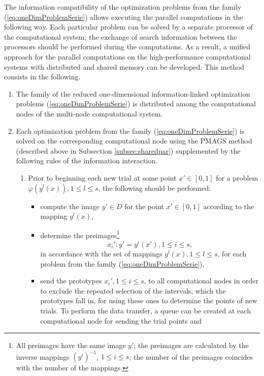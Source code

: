 \documentclass{aims}
\theoremstyle{definition}
\begin{document}
The information compatibility of the optimization problems from the family (\ref{eq:oneDimProblemSerie})
allows executing the parallel computations in the following way. Each particular
problem can be solved by a separate processor of the computational system; the exchange
of search information between the processors should be performed during the computations.
As a result, a unified approach for the parallel computations on the high-performance
computational systems with distributed and shared memory can be developed. This method consists in the following.
\begin{enumerate}
  \item The family of the reduced one-dimensional information-linked optimization
  problems (\ref{eq:oneDimProblemSerie}) is distributed among the computational nodes of the multi-node computational system.
  \item Each optimization problem from the family (\ref{eq:oneDimProblemSerie}) is solved on the
  corresponding computational node using the PMAGS method (described above in Subsection \ref{subsec:sharedpar})
  supplemented by the following rules of the information interaction.
  \begin{enumerate}
    \item Prior to beginning each new trial at some point \(x'\in [0,1]\) for a problem \(\varphi(y^l(x)),1\leq l\leq s\), the following should be performed:
    \begin{itemize}
      \item compute the image \(y'\in D\) for the point \(x'\in [0, 1]\) according to the mapping \(y^l(x)\),
      \item determine  the preimages\footnote{All preimages have the same
      image \(y'\); the preimages are calculated by the inverse mappings \((y^i)^{-1}\), \(1\le i\le s\);
      the number of the preimages coincides with the number of the mappings.}
      \begin{displaymath}
        x_i':y'=y^i(x'),1\le i\le s,
      \end{displaymath}
      in accordance with the set of mappings \(y^l(x), 1\le l\le s\), for each problem from the family (\ref{eq:oneDimProblemSerie}),
      \item send the prototypes \(x_i',1\leq i\leq s\), to all computational nodes in order
      to exclude the repeated selection of the intervals, which the prototypes fall in,
      for using these ones to determine the points of new trials. To perform the data transfer,
      a queue can be created at each computational node for sending the trial points and

\end{itemize}
\end{enumerate}
\end{enumerate}
\end{document}
